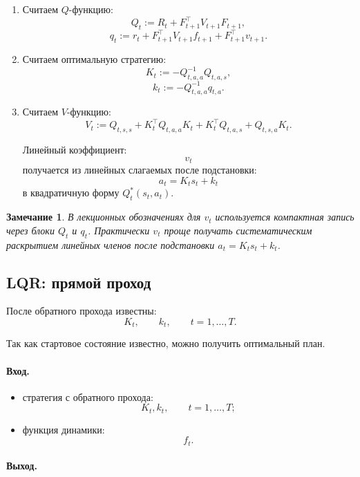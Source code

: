 \documentclass[12pt,a4paper]{article}
\newtheorem{remark}{Замечание}
\begin{document}
\begin{enumerate}
    \item Считаем $Q$-функцию:
    \[
    Q_t
    :=
    R_t
    +
    F_{t+1}^\top V_{t+1}F_{t+1},
    \]
    \[
    q_t
    :=
    r_t
    +
    F_{t+1}^\top V_{t+1}f_{t+1}
    +
    F_{t+1}^\top v_{t+1}.
    \]

    \item Считаем оптимальную стратегию:
    \[
    K_t
    :=
    -
    Q_{t,a,a}^{-1}Q_{t,a,s},
    \]
    \[
    k_t
    :=
    -
    Q_{t,a,a}^{-1}q_{t,a}.
    \]

    \item Считаем $V$-функцию:
    \[
    V_t
    :=
    Q_{t,s,s}
    +
    K_t^\top Q_{t,a,a}K_t
    +
    K_t^\top Q_{t,a,s}
    +
    Q_{t,s,a}K_t.
    \]

    Линейный коэффициент:
    \[
    v_t
    \]
    получается из линейных слагаемых после подстановки:
    \[
    a_t=K_ts_t+k_t
    \]
    в квадратичную форму $Q_t^\ast(s_t,a_t)$.
\end{enumerate}

\begin{remark}
В лекционных обозначениях для $v_t$ используется компактная запись через блоки $Q_t$ и $q_t$. Практически $v_t$ проще получать систематическим раскрытием линейных членов после подстановки $a_t=K_ts_t+k_t$.
\end{remark}

\subsection{LQR: прямой проход}

После обратного прохода известны:
\[
K_t,
\qquad
k_t,
\qquad
t=1,\ldots,T.
\]

Так как стартовое состояние известно, можно получить оптимальный план.

\paragraph{Вход.}

\begin{itemize}
    \item стратегия с обратного прохода:
    \[
    K_t,k_t,
    \qquad
    t=1,\ldots,T;
    \]

    \item функция динамики:
    \[
    f_t.
    \]
\end{itemize}

\paragraph{Выход.}
\end{document}
